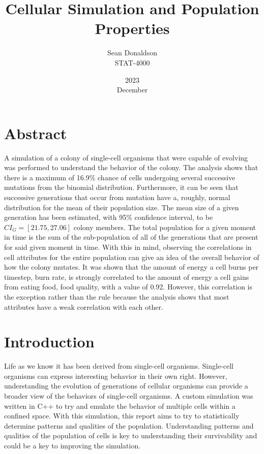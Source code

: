 \documentclass[12pt]{article}
\title{Cellular Simulation and Population Properties}
\date{2023\\ December}
\author{Sean Donaldson\\ STAT-4000}
\begin{document}
\maketitle
\section{Abstract}

	A simulation of a colony of single-cell organisms that were capable of evolving was performed to understand the behavior of the colony.
	The analysis shows that there is a maximum of 16.9\% chance of cells undergoing several successive mutations from the binomial distribution.
	Furthermore, it can be seen that successive generations that occur from mutation have a, roughly, normal distribution for the mean of their population size.
	The mean size of a given generation has been estimated, with 95\% confidence interval, to be $CI_G = [21.75, 27.06]$ colony members.
	The total population for a given moment in time is the sum of the sub-population of all of the generations that are present for said given moment in time.
	With this in mind, observing the correlations in cell attributes for the entire population can give an idea of the overall behavior of how the colony mutates.
	It was shown that the amount of energy a cell burns per timestep, burn rate, is strongly correlated to the amount of energy a cell gains from eating food, food quality, with a value of 0.92.
	However, this correlation is the exception rather than the rule because the analysis shows that most attributes have a weak correlation with each other.



\pagebreak
\section{Introduction}

	Life as we know it has been derived from single-cell organisms. 
	Single-cell organisms can express interesting behavior in their own right. 
	However, understanding the evolution of generations of cellular organisms can provide a broader view of the behaviors of single-cell organisms.
	A custom simulation was written in C++ to try and emulate the behavior of multiple cells within a confined space.
	With this simulation, this report aims to try to statistically determine patterns and qualities of the population.
	Understanding patterns and qualities of the population of cells is key to understanding their survivability and could be a key to improving the simulation.
\end{document}
